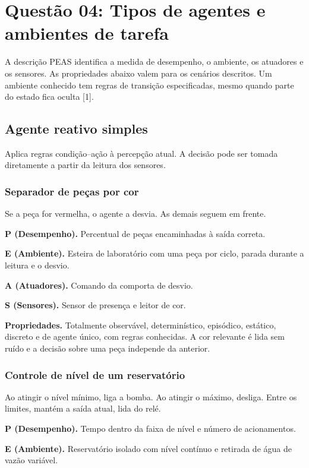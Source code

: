 \documentclass[12pt,a4paper]{article}
\begin{document}
\section{Questão 04: Tipos de agentes e ambientes de tarefa}

A descrição PEAS identifica a medida de desempenho, o ambiente, os atuadores e os sensores. As propriedades abaixo valem para os cenários descritos. Um ambiente conhecido tem regras de transição especificadas, mesmo quando parte do estado fica oculta [1].

\subsection{Agente reativo simples}

Aplica regras condição--ação à percepção atual. A decisão pode ser tomada diretamente a partir da leitura dos sensores.

\subsubsection{Separador de peças por cor}

Se a peça for vermelha, o agente a desvia. As demais seguem em frente.

\textbf{P (Desempenho).} Percentual de peças encaminhadas à saída correta.

\textbf{E (Ambiente).} Esteira de laboratório com uma peça por ciclo, parada durante a leitura e o desvio.

\textbf{A (Atuadores).} Comando da comporta de desvio.

\textbf{S (Sensores).} Sensor de presença e leitor de cor.

\textbf{Propriedades.} Totalmente observável, determinístico, episódico, estático, discreto e de agente único, com regras conhecidas. A cor relevante é lida sem ruído e a decisão sobre uma peça independe da anterior.

\subsubsection{Controle de nível de um reservatório}

Ao atingir o nível mínimo, liga a bomba. Ao atingir o máximo, desliga. Entre os limites, mantém a saída atual, lida do relé.

\textbf{P (Desempenho).} Tempo dentro da faixa de nível e número de acionamentos.

\textbf{E (Ambiente).} Reservatório isolado com nível contínuo e retirada de água de vazão variável.
\end{document}
